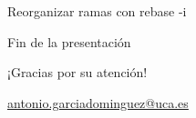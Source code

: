 \documentclass[compress,xcolor=svgnames]{beamer}
\begin{document}
\begin{frame}{Reorganizar ramas con rebase -i}

\end{frame}

\appendix

\begin{frame}{Fin de la presentación}
  \begin{center}
    {\Huge ¡Gracias por su atención!}

    \vspace{3em}

    {\Large
      \href{mailto:antonio.garciadominguez@uca.es}{antonio.garciadominguez@uca.es}}
  \end{center}
\end{frame}
\end{document}
